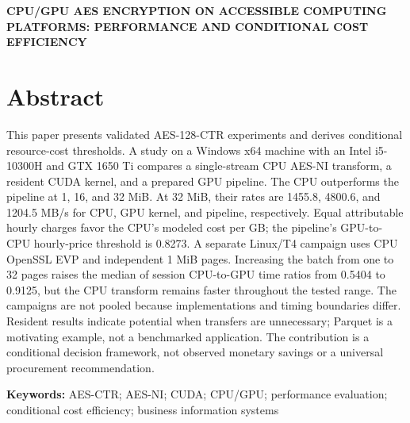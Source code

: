 \documentclass[11pt,b5paper]{article}
\begin{document}
\begin{center}
{\fontsize{13}{15}\selectfont\bfseries
CPU/GPU AES ENCRYPTION ON ACCESSIBLE COMPUTING PLATFORMS: PERFORMANCE AND CONDITIONAL COST EFFICIENCY\par}
\end{center}
\vspace{.2cm}
\section*{Abstract}
This paper presents validated AES-128-CTR experiments and derives conditional resource-cost thresholds. A study on a Windows x64 machine with an Intel i5-10300H and GTX 1650 Ti compares a single-stream CPU AES-NI transform, a resident CUDA kernel, and a prepared GPU pipeline. The CPU outperforms the pipeline at 1, 16, and 32 MiB. At 32 MiB, their rates are 1455.8, 4800.6, and 1204.5 MB/s for CPU, GPU kernel, and pipeline, respectively. Equal attributable hourly charges favor the CPU's modeled cost per GB; the pipeline's GPU-to-CPU hourly-price threshold is 0.8273. A separate Linux/T4 campaign uses CPU OpenSSL EVP and independent 1 MiB pages. Increasing the batch from one to 32 pages raises the median of session CPU-to-GPU time ratios from 0.5404 to 0.9125, but the CPU transform remains faster throughout the tested range. The campaigns are not pooled because implementations and timing boundaries differ. Resident results indicate potential when transfers are unnecessary; Parquet is a motivating example, not a benchmarked application. The contribution is a conditional decision framework, not observed monetary savings or a universal procurement recommendation.

\noindent\textbf{Keywords:} AES-CTR; AES-NI; CUDA; CPU/GPU; performance evaluation; conditional cost efficiency; business information systems
\end{document}
